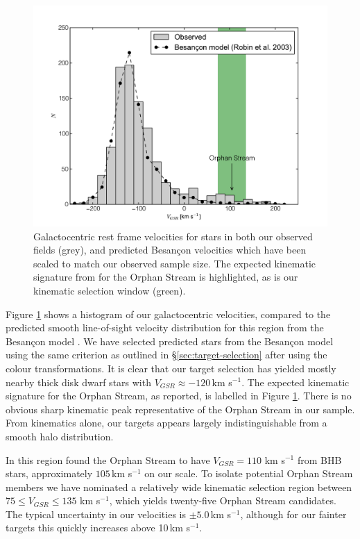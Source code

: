 \documentclass{emulateapj}
\begin{document}
\begin{figure}[h]
	\includegraphics[width=\columnwidth]{./figures/vgsr-histogram.pdf}
	\caption{Galactocentric rest frame velocities for stars in both our observed fields (grey), and predicted Besan\c{c}on velocities which have been scaled to match our observed sample size. The expected kinematic signature from \citet{Newberg;et-al_2010} for the Orphan Stream is highlighted, as is our kinematic selection window (green).}
	\label{fig:velocities}
\end{figure}

Figure \ref{fig:velocities} shows a histogram of our galactocentric velocities, compared to the predicted smooth line-of-sight velocity distribution for this region from the Besan\c{c}on model \citep{Robin;et-al_2003}. We have selected predicted stars from the Besan\c{c}on model using the same criterion as outlined in \S\ref{sec:target-selection} after using the \citet{Jordi;et-al_2006} colour transformations. It is clear that our target selection has yielded mostly nearby thick disk dwarf stars with $V_{GSR} \approx -120$\,km s$^{-1}$. The expected kinematic signature for the Orphan Stream, as \citet{Newberg;et-al_2010} reported, is labelled in Figure \ref{fig:velocities}. There is no obvious sharp kinematic peak representative of the Orphan Stream in our sample. From kinematics alone, our targets appears largely indistinguishable from a smooth halo distribution.

In this region \citet{Newberg;et-al_2010} found the Orphan Stream to have $V_{GSR} = 110$ km s$^{-1}$ from BHB stars, approximately $105$\,km s$^{-1}$ on our scale. To isolate potential Orphan Stream members we have nominated a relatively wide kinematic selection region between $75 \leq V_{GSR} \leq 135$ km s$^{-1}$, which yields twenty-five Orphan Stream candidates. The typical uncertainty in our velocities is $\pm{}5.0$\,km s$^{-1}$, although for our fainter targets this quickly increases above 10\,km s$^{-1}$.
\end{document}
